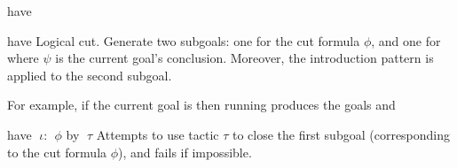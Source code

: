 \begin{tactic}{have}
  \begin{tsyntax}[empty]{have}
    Logical cut. Generate two subgoals: one for the cut formula
    $\phi$, and one for \ec{$\phi$ => $\;\psi$} where $\psi$ is the
    current goal's conclusion. Moreover, the introduction pattern
    \ec{$\iota$} is applied to the second subgoal.

  For example, if the current goal is
   then
  running 
  produces the goals
  and
  \end{tsyntax}

  \begin{tsyntax}{have $\;\iota$: $\;\phi$ by $\;\tau$}
  Attempts to use tactic $\tau$ to close the first subgoal (corresponding to
  the cut formula $\phi$), and fails if impossible.
  \end{tsyntax}
\end{tactic}

